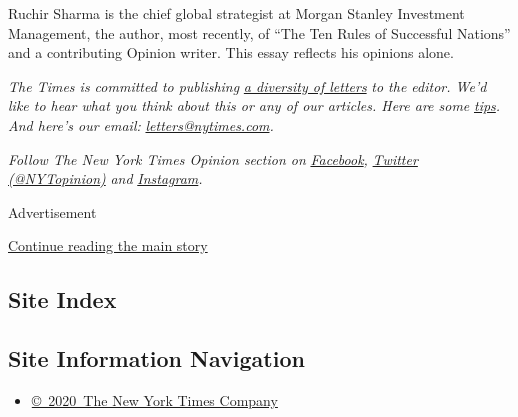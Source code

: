Ruchir Sharma is the chief global strategist at Morgan Stanley
Investment Management, the author, most recently, of ``The Ten Rules of
Successful Nations'' and a contributing Opinion writer. This essay
reflects his opinions alone.

\emph{The Times is committed to publishing}
\href{https://www.nytimes.com/2019/01/31/opinion/letters/letters-to-editor-new-york-times-women.html}{\emph{a
diversity of letters}} \emph{to the editor. We'd like to hear what you
think about this or any of our articles. Here are some}
\href{https://help.nytimes.com/hc/en-us/articles/115014925288-How-to-submit-a-letter-to-the-editor}{\emph{tips}}\emph{.
And here's our email:}
\href{mailto:letters@nytimes.com}{\emph{letters@nytimes.com}}\emph{.}

\emph{Follow The New York Times Opinion section on}
\href{https://www.facebook.com/nytopinion}{\emph{Facebook}}\emph{,}
\href{http://twitter.com/NYTOpinion}{\emph{Twitter (@NYTopinion)}}
\emph{and}
\href{https://www.instagram.com/nytopinion/}{\emph{Instagram}}\emph{.}

Advertisement

\protect\hyperlink{after-bottom}{Continue reading the main story}

\hypertarget{site-index}{%
\subsection{Site Index}\label{site-index}}

\hypertarget{site-information-navigation}{%
\subsection{Site Information
Navigation}\label{site-information-navigation}}

\begin{itemize}
\tightlist
\item
  \href{https://help.nytimes.com/hc/en-us/articles/115014792127-Copyright-notice}{©~2020~The
  New York Times Company}
\end{itemize}

